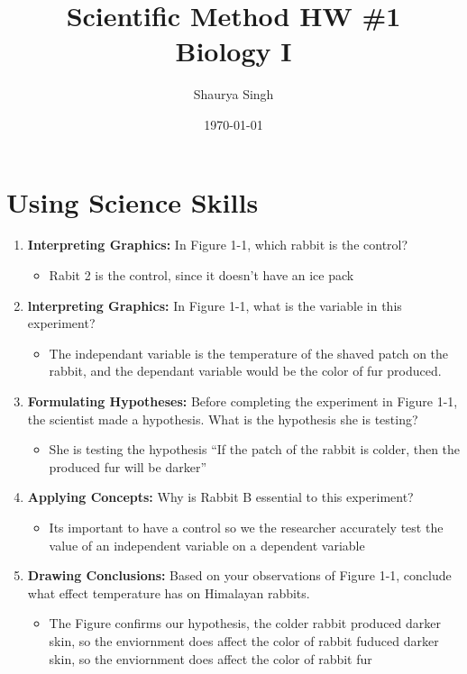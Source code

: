 \documentclass{scrartcl}
\author{Shaurya Singh}
\date{\today}
\title{Scientific Method HW \#1\\\medskip
\large Biology I}
\begin{document}
\maketitle
\setcounter{tocdepth}{2}
\tableofcontents


\section{Using Science Skills}
\label{sec:org6c3227d}
\begin{enumerate}
\item \textbf{Interpreting Graphics:} In Figure 1-1, which rabbit is the control?
\begin{itemize}
\item Rabit 2 is the control, since it doesn't have an ice pack
\end{itemize}
\item \textbf{lnterpreting Graphics:} In Figure 1-1, what is the variable in this
experiment?
\begin{itemize}
\item The independant variable is the temperature of the shaved patch on the
rabbit, and the dependant variable would be the color of fur produced.
\end{itemize}
\item \textbf{Formulating Hypotheses:} Before completing the experiment in Figure 1-1, the
scientist made a hypothesis. What is the hypothesis she is testing?
\begin{itemize}
\item She is testing the hypothesis ``If the patch of the rabbit is colder, then
the produced fur will be darker''
\end{itemize}
\item \textbf{Applying Concepts:} Why is Rabbit B essential to this experiment?
\begin{itemize}
\item Its important to have a control so we the researcher accurately test the
value of an independent variable on a dependent variable
\end{itemize}
\item \textbf{Drawing Conclusions:} Based on your observations of Figure 1-1, conclude what
effect temperature has on Himalayan rabbits.
\begin{itemize}
\item The Figure confirms our hypothesis, the colder rabbit produced darker skin,
so the enviornment does affect the color of rabbit fuduced darker skin, so
the enviornment does affect the color of rabbit fur
\end{itemize}
\end{enumerate}
\end{document}
